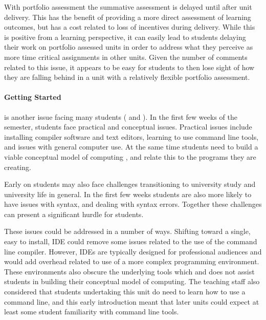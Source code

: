 With portfolio assessment the summative assessment is delayed until after unit delivery. This has the benefit of providing a more direct assessment of learning outcomes, but has a cost related to loss of incentives during delivery. While this is positive from a learning perspective, it can easily lead to students delaying their work on portfolio assessed units in order to address what they perceive as more time critical assignments in other units. Given the number of comments related to this issue, it appears to be easy for students to then lose sight of how they are falling behind in a unit with a relatively flexible portfolio assessment.


\paragraph{Getting Started} %
\label{ssub:getting_started}

is another issue facing many students ( and ). In the first few weeks of the semester, students face practical and conceptual issues. Practical issues include installing compiler software and text editors, learning to use command line tools, and issues with general computer use. At the same time students need to build a viable conceptual model of computing \cite{Hoc:1990}, and relate this to the programs they are creating. 

Early on students may also face challenges transitioning to university study and university life in general. In the first few weeks students are also more likely to have issues with syntax, and dealing with syntax errors. Together these challenges can present a significant hurdle for students.

These issues could be addressed in a number of ways. Shifting toward a single, easy to install, IDE could remove some issues related to the use of the command line compiler. However, IDEs are typically designed for professional audiences and would add overhead related to use of a more complex programming environment. These environments also obscure the underlying tools which and does not assist students in building their conceptual model of computing. The teaching staff also considered that students undertaking this unit do need to learn how to use a command line, and this early introduction meant that later units could expect at least some student familiarity with command line tools.

